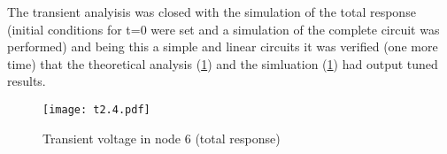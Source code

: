 The transient analyisis was closed with the simulation of the total response (initial conditions for t=0 were set and a simulation of the complete circuit was performed) and being this a simple and linear circuits it was verified (one more time) that the theoretical analysis (\ref{fig:trans2}) and the simluation (\ref{fig:trans2}) had output tuned results.

\begin{figure}[h] \centering
\texttt{[image: t2.4.pdf]}
\caption{Transient voltage in node 6 (total response)}
\label{fig:trans2}
\end{figure}














